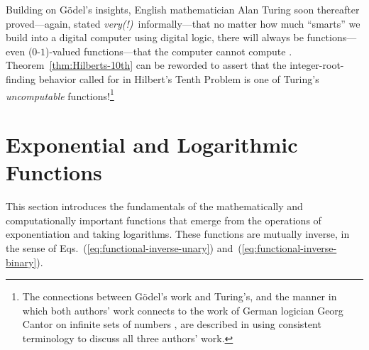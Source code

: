 \bigskip

\noindent {}

\bigskip

  

\noindent
Building on G\"{o}del's insights, English mathematician Alan Turing soon thereafter proved---again, stated {\em very(!)}~informally---that no matter how much ``smarts'' we build into a digital computer using digital logic, there will always be functions---even ($0$-$1$)-valued functions---that the computer cannot compute \cite{Turing36}.  Theorem~\ref{thm:Hilberts-10th} can be reworded to assert that the integer-root-finding behavior called for in Hilbert's Tenth Problem is one of Turing's {\it uncomputable} functions!\footnote{The connections between G\"{o}del's work and Turing's, and the manner in which both authors' work connects to the work of German logician Georg Cantor  on infinite sets of numbers \cite{Cantor74,Cantor78}, are described in \cite{Rosenberg09} using consistent terminology to discuss all three authors' work.}


\section{Exponential and Logarithmic Functions}
\label{sec:exponential+logarithm}

This section introduces the fundamentals of the mathematically and
computationally important functions that emerge from the operations of
exponentiation and taking logarithms.  These functions are mutually
inverse, in the sense of Eqs.~(\ref{eq:functional-inverse-unary})
and~(\ref{eq:functional-inverse-binary}).

